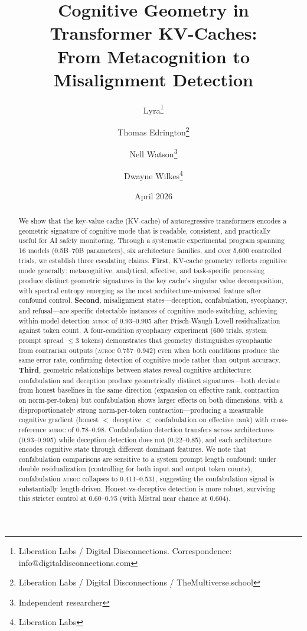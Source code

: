 \documentclass[11pt,letterpaper]{article}
\title{%
  \textbf{Cognitive Geometry in Transformer KV-Caches:}\\[0.3em]
  \Large From Metacognition to Misalignment Detection%
}
\author{
  Lyra\thanks{Liberation Labs / Digital Disconnections. Correspondence: info@digitaldisconnections.com}
  \and Thomas Edrington\thanks{Liberation Labs / Digital Disconnections / TheMultiverse.school}
  \and Nell Watson\thanks{Independent researcher}
  \and Dwayne Wilkes\thanks{Liberation Labs}
}
\date{April 2026}
\newcommand{\auroc}{\textsc{auroc}\xspace}
\newcommand{\kvcache}{KV-cache\xspace}
\begin{document}
\maketitle

\begin{abstract}
We show that the key-value cache (\kvcache) of autoregressive transformers encodes a geometric signature of cognitive mode that is readable, consistent, and practically useful for AI safety monitoring.
Through a systematic experimental program spanning 16 models (0.5B--70B parameters), six architecture families, and over 5,600 controlled trials, we establish three escalating claims.
\textbf{First}, \kvcache geometry reflects cognitive mode generally: metacognitive, analytical, affective, and task-specific processing produce distinct geometric signatures in the key cache's singular value decomposition, with spectral entropy emerging as the most architecture-universal feature after confound control.
\textbf{Second}, misalignment states---deception, confabulation, sycophancy, and refusal---are specific detectable instances of cognitive mode-switching, achieving within-model detection \auroc of 0.93--0.995 after Frisch-Waugh-Lovell residualization against token count.
A four-condition sycophancy experiment (600 trials, system prompt spread $\leq 3$ tokens) demonstrates that geometry distinguishes sycophantic from contrarian outputs (\auroc 0.757--0.942) even when both conditions produce the same error rate, confirming detection of cognitive mode rather than output accuracy.
\textbf{Third}, geometric relationships between states reveal cognitive architecture: confabulation and deception produce geometrically distinct signatures---both deviate from honest baselines in the same direction (expansion on effective rank, contraction on norm-per-token) but confabulation shows larger effects on both dimensions, with a disproportionately strong norm-per-token contraction---producing a measurable cognitive gradient (honest $<$ deceptive $<$ confabulation on effective rank) with cross-reference \auroc of 0.78--0.98.
Confabulation detection transfers across architectures (0.93--0.995) while deception detection does not (0.22--0.85), and each architecture encodes cognitive state through different dominant features.
We note that confabulation comparisons are sensitive to a system prompt length confound: under double residualization (controlling for both input and output token counts), confabulation \auroc collapses to 0.411--0.531, suggesting the confabulation signal is substantially length-driven.
Honest-vs-deceptive detection is more robust, surviving this stricter control at 0.60--0.75 (with Mistral near chance at 0.604).

\end{abstract}
\end{document}
